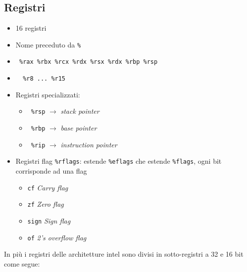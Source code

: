 \subsection{Registri}
\begin{itemize}
	\item 16 registri
	\item Nome preceduto da \verb|%|
	\item \verb| %rax %rbx %rcx %rdx %rsx %rdx %rbp %rsp |
	\item \verb|  %r8 ... %r15|
	\item Registri specializzati:
	      \begin{itemize}
		      \item \verb| %rsp| $ \rightarrow  $ \textit{stack pointer}
		      \item \verb| %rbp| $ \rightarrow  $ \textit{base pointer}
		      \item \verb| %rip| $ \rightarrow  $ \textit{instruction pointer}
	      \end{itemize}
	\item Registri flag \verb|%rflags|: estende \verb|%eflags| che estende \verb|%flags|, ogni bit corrisponde ad una flag
	      \begin{itemize}
		      \item \verb|cf| \textit{Carry flag}
		      \item \verb|zf| \textit{Zero flag}
		      \item \verb|sign| \textit{Sign flag}
		      \item \verb|of| \textit{2's overflow flag}
	      \end{itemize}
\end{itemize}
In più i registri delle architetture intel sono divisi in sotto-registri a 32 e 16 bit come segue:

